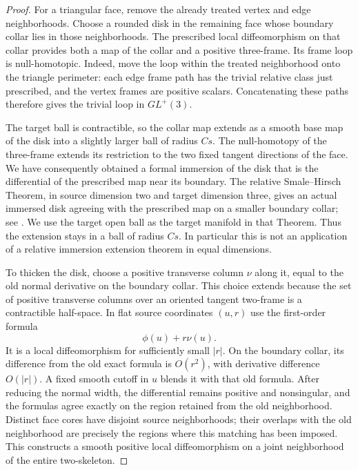 \begin{proof}
For a triangular face, remove the already treated vertex and edge
neighborhoods.  Choose a rounded disk in the remaining face whose
boundary collar lies in those neighborhoods.  The prescribed local
diffeomorphism on that collar provides both a map of the collar and a
positive three-frame.  Its frame loop is null-homotopic.  Indeed, move
the loop within the treated neighborhood onto the triangle perimeter:
each edge frame path has the trivial relative class just prescribed,
and the vertex frames are positive scalars.  Concatenating these paths
therefore gives the trivial loop in $GL^+(3)$.

The target ball is contractible, so the collar map extends as a smooth
base map of the disk into a slightly larger ball of radius $Cs$.
The null-homotopy of the three-frame extends its restriction to the two
fixed tangent directions of the face.  We have consequently obtained
a formal immersion of the disk that is the differential of the
prescribed map near its boundary.  The relative Smale--Hirsch Theorem,
in source dimension two and target dimension three, gives an actual
immersed disk agreeing with the prescribed map on a smaller boundary
collar; see \cite[Theorem~5.7]{Hirsch1959}.  We use the target open ball
as the target manifold in that Theorem.  Thus the extension stays in
a ball of radius $Cs$.  In particular this is not an application of a
relative immersion extension theorem in equal dimensions.

To thicken the disk, choose a positive transverse column $\nu$ along it,
equal to the old normal derivative on the boundary collar.  This
choice extends because the set of positive transverse columns over
an oriented tangent two-frame is a contractible half-space.  In flat
source coordinates $(u,r)$ use the first-order formula
\[
 \phi(u)+r\nu(u).
\]
It is a local diffeomorphism for sufficiently small $|r|$.  On the
boundary collar, its difference from the old exact formula is
$O(r^2)$, with derivative difference $O(|r|)$.  A fixed smooth cutoff
in $u$ blends it with that old formula.  After reducing the normal
width, the differential remains positive and nonsingular, and the
formulas agree exactly on the region retained from the old
neighborhood.  Distinct face cores have disjoint source neighborhoods;
their overlaps with the old neighborhood are precisely the regions
where this matching has been imposed.  This constructs a smooth
positive local diffeomorphism on a joint neighborhood of the entire
two-skeleton.


\end{proof}
